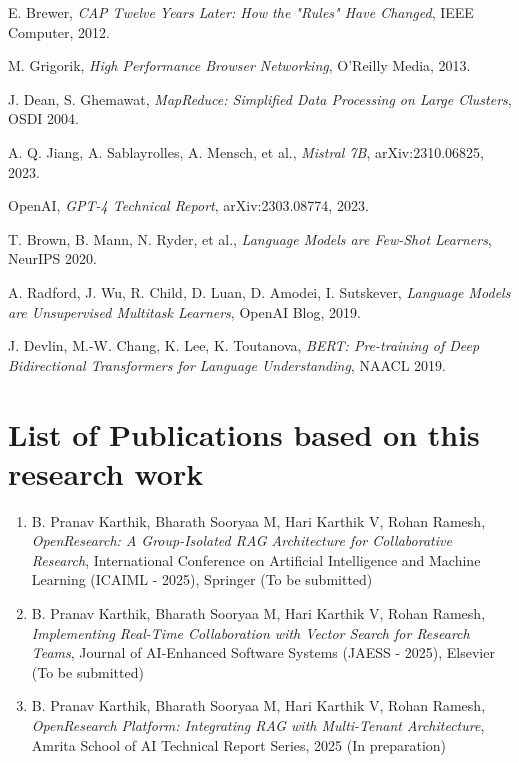 \documentclass[12pt]{report}
\begin{document}
\begin{enumerate}
    \bibitem{[13]} E. Brewer, \emph{CAP Twelve Years Later: How the "Rules" Have Changed}, IEEE Computer, 2012.
    
    \bibitem{[14]} M. Grigorik, \emph{High Performance Browser Networking}, O'Reilly Media, 2013.
    
    \bibitem{[15]} J. Dean, S. Ghemawat, \emph{MapReduce: Simplified Data Processing on Large Clusters}, OSDI 2004.
    
    \bibitem{[16]} A. Q. Jiang, A. Sablayrolles, A. Mensch, et al., \emph{Mistral 7B}, arXiv:2310.06825, 2023.
    
    \bibitem{[17]} OpenAI, \emph{GPT-4 Technical Report}, arXiv:2303.08774, 2023.
    
    \bibitem{[18]} T. Brown, B. Mann, N. Ryder, et al., \emph{Language Models are Few-Shot Learners}, NeurIPS 2020.
    
    \bibitem{[19]} A. Radford, J. Wu, R. Child, D. Luan, D. Amodei, I. Sutskever, \emph{Language Models are Unsupervised Multitask Learners}, OpenAI Blog, 2019.
    
    \bibitem{[20]} J. Devlin, M.-W. Chang, K. Lee, K. Toutanova, \emph{BERT: Pre-training of Deep Bidirectional Transformers for Language Understanding}, NAACL 2019.
\end{enumerate}

\chapter*{List of Publications based on this research work\hfill} 
\begin{enumerate}
    \item B. Pranav Karthik, Bharath Sooryaa M, Hari Karthik V, Rohan Ramesh, \textit{OpenResearch: A Group-Isolated RAG Architecture for Collaborative Research}, International Conference on Artificial Intelligence and Machine Learning (ICAIML - 2025), Springer (To be submitted)
    
    \item B. Pranav Karthik, Bharath Sooryaa M, Hari Karthik V, Rohan Ramesh, \textit{Implementing Real-Time Collaboration with Vector Search for Research Teams}, Journal of AI-Enhanced Software Systems (JAESS - 2025), Elsevier (To be submitted)
    
    \item B. Pranav Karthik, Bharath Sooryaa M, Hari Karthik V, Rohan Ramesh, \textit{OpenResearch Platform: Integrating RAG with Multi-Tenant Architecture}, Amrita School of AI Technical Report Series, 2025 (In preparation)
\end{enumerate}

\end{document}
